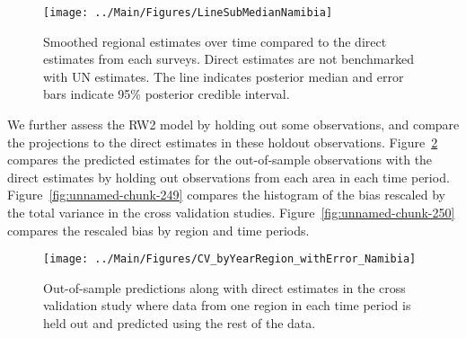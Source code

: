 \documentclass[12pt]{article}\usepackage[]{graphicx}\usepackage[]{color}
\newenvironment{knitrout}{}{} %
\begin{document}
\begin{knitrout}
\color{fgcolor}\begin{figure}[bht]

{\centering \texttt{[image: ../Main/Figures/LineSubMedianNamibia]} 

}

\caption[Smoothed regional estimates over time compared to the direct estimates from each surveys]{Smoothed regional estimates over time compared to the direct estimates from each surveys. Direct estimates are not benchmarked with UN estimates. The line indicates posterior median and error bars indicate 95\% posterior credible interval.}\label{fig:unnamed-chunk-247}
\end{figure}


\end{knitrout}
We further assess the RW2 model by holding out some observations, and compare the projections to the direct estimates in these holdout observations. Figure~\ref{fig:unnamed-chunk-248} compares the predicted estimates for the out-of-sample observations  with the direct estimates by holding out observations from each area in each time period.  Figure~\ref{fig:unnamed-chunk-249} compares the histogram of the bias rescaled by the total variance in the cross validation studies. Figure~\ref{fig:unnamed-chunk-250} compares the rescaled bias by region and time periods.



 
\begin{knitrout}
\color{fgcolor}\begin{figure}[bht]

{\centering \texttt{[image: ../Main/Figures/CV\_byYearRegion\_withError\_Namibia]} 

}

\caption[Out-of-sample predictions along with direct estimates in the cross validation study where data from one region in each time period is held out and predicted using the rest of the data]{Out-of-sample predictions along with direct estimates in the cross validation study where data from one region in each time period is held out and predicted using the rest of the data.}\label{fig:unnamed-chunk-248}
\end{figure}


\end{knitrout}
\end{document}
